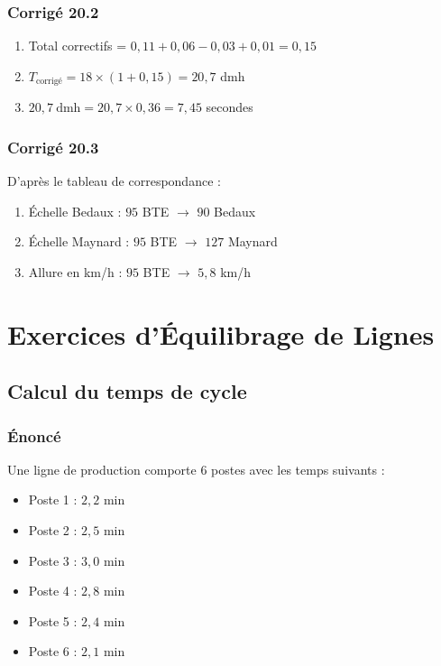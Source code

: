 \documentclass[a4paper,12pt]{article}
\begin{document}
\subsubsection*{Corrigé 20.2}

\begin{enumerate}
    \item Total correctifs = $0,11 + 0,06 - 0,03 + 0,01 = 0,15$
    \item $T_{\text{corrigé}} = 18 \times (1 + 0,15) = 20,7$ dmh
    \item $20,7\ \text{dmh} = 20,7 \times 0,36 = 7,45$ secondes
\end{enumerate}

\subsubsection*{Corrigé 20.3}

D'après le tableau de correspondance :
\begin{enumerate}
    \item Échelle Bedaux : $95$ BTE $\rightarrow$ $90$ Bedaux
    \item Échelle Maynard : $95$ BTE $\rightarrow$ $127$ Maynard
    \item Allure en km/h : $95$ BTE $\rightarrow$ $5,8$ km/h
\end{enumerate}

\section{Exercices d'Équilibrage de Lignes}

\subsection{Calcul du temps de cycle}

\subsubsection*{Énoncé}

Une ligne de production comporte $6$ postes avec les temps suivants :

\begin{itemize}
    \item Poste 1 : $2,2$ min
    \item Poste 2 : $2,5$ min
    \item Poste 3 : $3,0$ min
    \item Poste 4 : $2,8$ min
    \item Poste 5 : $2,4$ min
    \item Poste 6 : $2,1$ min
\end{itemize}
\end{document}
